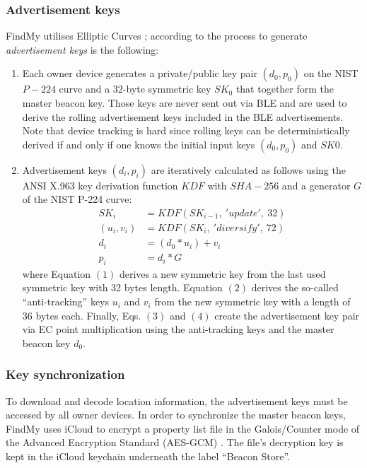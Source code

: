 \documentclass[english]{article}
\begin{document}
\subsubsection{Advertisement keys}\label{keys}
FindMy utilises Elliptic Curves \cite{ec}; according to \cite{aps,whocanfind} the process to generate \textit{advertisement keys} is the following:
\begin{enumerate}
  \item Each owner device generates a private/public key pair
  $(d_0, p_0)$ on the NIST $P-224$ curve and a $32$-byte symmetric key $SK_0$ that together form the master beacon key. Those keys are never sent out via BLE and are used to derive the rolling advertisement keys included in the BLE advertisements. Note that device tracking is hard since rolling keys can be deterministically derived if and only if one knows the initial input keys $(d_0, p_0)$ and $SK0$.
  \item Advertisement keys $(d_i,p_i)$ are iteratively calculated as follows using the ANSI X.963 key derivation function $KDF$ \cite{ANSI} with $SHA-256$ \cite{sha} and a generator $G$ of the NIST P-224 curve:
  \begin{align}
    SK_i &= KDF(SK_{i-1},\ 'update',\ 32) \\
    (u_i, v_i) &= KDF(SK_i,\ 'diversify',\ 72) \\
    d_i &= (d_0 * u_i) + v_i \\
    p_i &= d_i * G
  \end{align}
  where Equation $(1)$ derives a new symmetric key from the last used symmetric key with 32 bytes length. Equation $(2)$ derives the so-called “anti-tracking” keys $u_i$ and $v_i$ from the new symmetric key with a length of $36$ bytes each. Finally, Eqs. $(3)$ and $(4)$ create the advertisement key pair via EC point multiplication using the anti-tracking keys and the master beacon key $d_0$.
\end{enumerate}

\subsubsection{Key synchronization}
To download and decode location information, the advertisement keys must be accessed by all owner devices. In order to synchronize the master beacon keys, FindMy uses iCloud to encrypt a property list file in the Galois/Counter mode of the Advanced Encryption Standard (AES-GCM) \cite{gcm}. The file's decryption key is kept in the iCloud keychain underneath the label “Beacon Store”.
\end{document}
